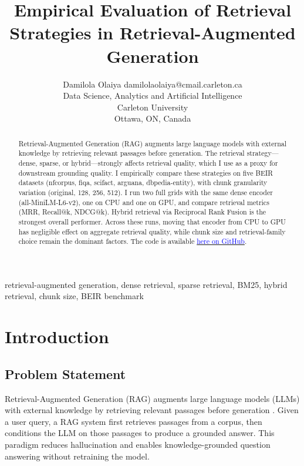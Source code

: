 \documentclass[twoside, 11pt]{article}
\begin{document}
\title{Empirical Evaluation of Retrieval Strategies in Retrieval-Augmented Generation}

\author{\name Damilola Olaiya \email damilolaolaiya@cmail.carleton.ca \\
\addr Data Science, Analytics and Artificial Intelligence\\
Carleton University\\
Ottawa, ON, Canada}

\maketitle

\begin{abstract}
Retrieval-Augmented Generation (RAG) augments large language models with external knowledge by retrieving relevant passages before generation. The retrieval strategy---dense, sparse, or hybrid---strongly affects retrieval quality, which I use as a proxy for downstream grounding quality. I empirically compare these strategies on five BEIR datasets (nfcorpus, fiqa, scifact, arguana, dbpedia-entity), with chunk granularity variation (original, 128, 256, 512). I run two full grids with the same dense encoder (all-MiniLM-L6-v2), one on CPU and one on GPU, and compare retrieval metrics (MRR, Recall@k, NDCG@k). Hybrid retrieval via Reciprocal Rank Fusion is the strongest overall performer. Across these runs, moving that encoder from CPU to GPU has negligible effect on aggregate retrieval quality, while chunk size and retrieval-family choice remain the dominant factors. The code is available \href{https://github.com/Daolaiya/rag-retrieval}{\textcolor{blue}{here on GitHub}}.
\end{abstract}

\begin{keywords}
retrieval-augmented generation, dense retrieval, sparse retrieval, BM25, hybrid retrieval, chunk size, BEIR benchmark
\end{keywords}

\section{Introduction}
\subsection{Problem Statement}
Retrieval-Augmented Generation (RAG) augments large language models (LLMs) with external knowledge by retrieving relevant passages before generation \citep{lewis2020rag}. Given a user query, a RAG system first retrieves passages from a corpus, then conditions the LLM on those passages to produce a grounded answer. This paradigm reduces hallucination and enables knowledge-grounded question answering without retraining the model.
\end{document}
